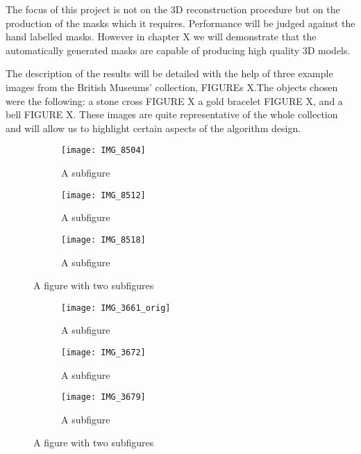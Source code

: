 \documentclass[12pt]{IIBproject}
\begin{document}
The focus of this project is not on the 3D reconstruction procedure but on the production of the masks which it requires. Performance will be judged against the hand labelled masks. However in chapter X we will demonstrate that the automatically generated masks are capable of producing high quality 3D models.

The description of the results will be detailed with the help of three example images from the British Museums' collection, FIGUREs X.The objects chosen were the following: a stone cross FIGURE X a gold bracelet FIGURE X, and a bell FIGURE X. These images are quite representative of the whole collection and will allow us to highlight certain aspects of the algorithm design. 
\begin{figure}[H]
\centering
\begin{subfigure}{.33\textwidth}
  \centering
  \texttt{[image: IMG\_8504]}
  \caption{A subfigure}
  \label{fig:sub1}
\end{subfigure}%
\begin{subfigure}{.33\textwidth}
  \centering
  \texttt{[image: IMG\_8512]}
  \caption{A subfigure}
  \label{fig:sub2}
\end{subfigure}
\begin{subfigure}{.33\textwidth}
  \centering
  \texttt{[image: IMG\_8518]}
  \caption{A subfigure}
  \label{fig:sub2}
\end{subfigure}
\caption{A figure with two subfigures}
\label{fig:test}
\end{figure}

\begin{figure}[H]
\centering
\begin{subfigure}{.33\textwidth}
  \centering
  \texttt{[image: IMG\_3661\_orig]}
  \caption{A subfigure}
  \label{fig:sub1}
\end{subfigure}%
\begin{subfigure}{.33\textwidth}
  \centering
  \texttt{[image: IMG\_3672]}
  \caption{A subfigure}
  \label{fig:sub2}
\end{subfigure}
\begin{subfigure}{.33\textwidth}
  \centering
  \texttt{[image: IMG\_3679]}
  \caption{A subfigure}
  \label{fig:sub2}
\end{subfigure}
\caption{A figure with two subfigures}
\label{fig:test}
\end{figure}
\end{document}
